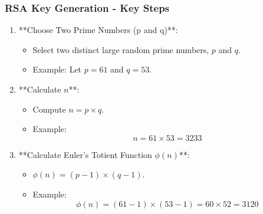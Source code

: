 \documentclass{beamer}
\begin{document}
\begin{frame}[fragile]
    \frametitle{RSA Key Generation - Key Steps}
    \begin{enumerate}
        \item **Choose Two Prime Numbers (p and q)**:
        \begin{itemize}
            \item Select two distinct large random prime numbers, \( p \) and \( q \).
            \item Example: Let \( p = 61 \) and \( q = 53 \).
        \end{itemize}

        \item **Calculate \( n \)**:
        \begin{itemize}
            \item Compute \( n = p \times q \).
            \item Example: 
            \[
            n = 61 \times 53 = 3233
            \]
        \end{itemize}

        \item **Calculate Euler's Totient Function \( \phi(n) \)**:
        \begin{itemize}
            \item \( \phi(n) = (p-1) \times (q-1) \).
            \item Example:
            \[
            \phi(n) = (61 - 1) \times (53 - 1) = 60 \times 52 = 3120
            \]
        \end{itemize}
    \end{enumerate}
\end{frame}
\end{document}
